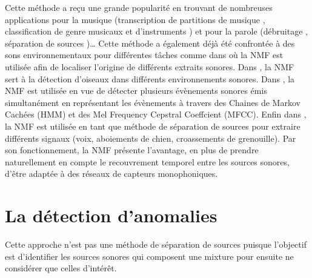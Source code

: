 Cette méthode a reçu une grande popularité en trouvant de nombreuses applications pour la musique (transcription de partitions de musique \cite{smaragdis_non-negative_2003,bertin2009tempering}, classification de genre musicaux \cite{panagakis2008music} et d'instruments \cite{benetos2006musical}) et pour la parole (débruitage \cite{wilson2008speech,sprechmann2014supervised}, séparation de sources \cite{smaragdis2007convolutive,
hurmalainen2012detection})\dots{}
Cette méthode a également déjà été confrontée à des sons environnementaux pour différentes tâches comme dans \cite{kumar2016audio} où la NMF est utilisée afin de localiser l'origine de différents extraits sonores. Dans \cite{sobieraj2017masked}, la NMF sert à la détection d'oiseaux dans différents environnements sonores. Dans \cite{heittola_sound_2011}, la NMF est utilisée en vue de détecter plusieurs évènements sonores émis simultanément en représentant les évènements à travers des Chaines de Markov Cachées (HMM) et des Mel Frequency Cepstral Coeffcient (MFCC).  Enfin dans \cite{satoshi_innami_nmf-based_2012}, la NMF est utilisée en tant que méthode de séparation de sources pour extraire différents signaux (voix, aboiements de chien, croassements de grenouille).
Par son fonctionnement, la NMF présente l'avantage, en plus de prendre naturellement en compte le recouvrement temporel entre les sources sonores, d'être adaptée à des réseaux de capteurs monophoniques.


\section{La détection d'anomalies}

Cette approche n'est pas une méthode de séparation de sources puisque l'objectif est d'identifier les sources sonores qui composent une mixture pour ensuite ne considérer que celles d'intérêt.

